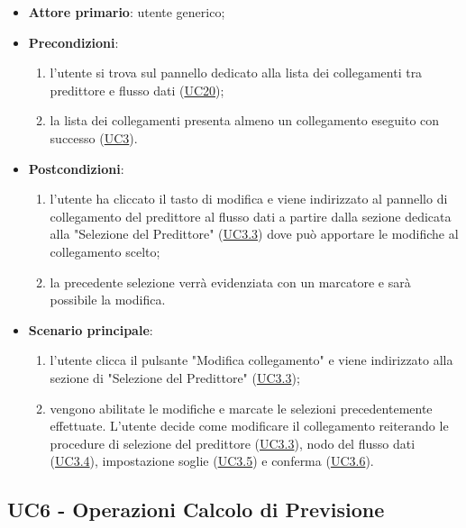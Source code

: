 		\begin{itemize}
			\item\textbf{Attore primario}: utente generico;
			\item\textbf{Precondizioni}:
				\begin{enumerate}
					\item l'utente si trova sul pannello dedicato alla lista dei collegamenti tra predittore e flusso dati (\hyperref[par:UC20]{UC20});
					\item la lista dei collegamenti presenta almeno un collegamento eseguito con successo (\hyperref[par:UC3]{UC3}).
				\end{enumerate}
			\item\textbf{Postcondizioni}:
				\begin{enumerate}
					\item l’utente ha cliccato il tasto di modifica e viene indirizzato al pannello di collegamento del predittore al flusso dati a partire dalla sezione dedicata alla "Selezione del Predittore" (\hyperref[par:UC3.3]{UC3.3}) dove può apportare le modifiche al collegamento scelto;
					\item la precedente selezione verrà evidenziata con un marcatore e sarà possibile la modifica.
				\end{enumerate}
			\item\textbf{Scenario principale}:
				\begin{enumerate}
					\item l'utente clicca il pulsante "Modifica collegamento" e viene indirizzato alla sezione di "Selezione del Predittore" (\hyperref[par:UC3.3]{UC3.3});
					\item vengono abilitate le modifiche e marcate le selezioni precedentemente effettuate. L'utente decide come modificare il collegamento reiterando le procedure di selezione del predittore (\hyperref[par:UC3.3]{UC3.3}), nodo del flusso dati (\hyperref[par:UC3.4]{UC3.4}), impostazione soglie (\hyperref[par:UC3.5]{UC3.5}) e conferma (\hyperref[par:UC3.6]{UC3.6}).
				\end{enumerate}		
		\end{itemize}



	\label{par:UC6}
	\subsection{UC6 - Operazioni Calcolo di Previsione}

